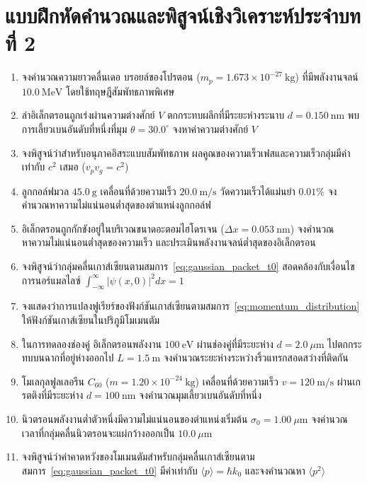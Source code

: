 \section{แบบฝึกหัดคำนวณและพิสูจน์เชิงวิเคราะห์ประจำบทที่ 2}

\begin{enumerate}
    \item จงคำนวณความยาวคลื่นเดอ บรอยล์ของโปรตอน ($m_p = 1.673 \times 10^{-27}~\text{kg}$) ที่มีพลังงานจลน์ $10.0~\text{MeV}$ โดยใช้ทฤษฎีสัมพัทธภาพพิเศษ
    \item ลำอิเล็กตรอนถูกเร่งผ่านความต่างศักย์ $V$ ตกกระทบผลึกที่มีระยะห่างระนาบ $d = 0.150~\text{nm}$ พบการเลี้ยวเบนอันดับที่หนึ่งที่มุม $\theta = 30.0^\circ$ จงหาค่าความต่างศักย์ $V$
    \item จงพิสูจน์ว่าสำหรับอนุภาคอิสระแบบสัมพัทธภาพ ผลคูณของความเร็วเฟสและความเร็วกลุ่มมีค่าเท่ากับ $c^2$ เสมอ ($v_p v_g = c^2$)
    \item ลูกกอล์ฟมวล $45.0~\text{g}$ เคลื่อนที่ด้วยความเร็ว $20.0~\text{m/s}$ วัดความเร็วได้แม่นยำ $0.01\%$ จงคำนวณหาความไม่แน่นอนต่ำสุดของตำแหน่งลูกกอล์ฟ
    \item อิเล็กตรอนถูกกักขังอยู่ในบริเวณขนาดอะตอมไฮโดรเจน ($\Delta x = 0.053~\text{nm}$) จงคำนวณหาความไม่แน่นอนต่ำสุดของความเร็ว และประเมินพลังงานจลน์ต่ำสุดของอิเล็กตรอน
    \item จงพิสูจน์ว่ากลุ่มคลื่นเกาส์เซียนตามสมการ~\eqref{eq:gaussian_packet_t0} สอดคล้องกับเงื่อนไขการนอร์แมลไลซ์ $\int_{-\infty}^\infty |\psi(x, 0)|^2 dx = 1$
    \item จงแสดงว่าการแปลงฟูเรียร์ของฟังก์ชันเกาส์เซียนตามสมการ~\eqref{eq:momentum_distribution} ให้ฟังก์ชันเกาส์เซียนในปริภูมิโมเมนตัม
    \item ในการทดลองช่องคู่ อิเล็กตรอนพลังงาน $100~\text{eV}$ ผ่านช่องคู่ที่มีระยะห่าง $d = 2.0~\mu\text{m}$ ไปตกกระทบบนฉากที่อยู่ห่างออกไป $L = 1.5~\text{m}$ จงคำนวณระยะห่างระหว่างริ้วแทรกสอดสว่างที่ติดกัน
    \item โมเลกุลฟูลเลอรีน $C_{60}$ ($m = 1.20 \times 10^{-24}~\text{kg}$) เคลื่อนที่ด้วยความเร็ว $v = 120~\text{m/s}$ ผ่านเกรตติงที่มีระยะห่าง $d = 100~\text{nm}$ จงคำนวณมุมเลี้ยวเบนอันดับที่หนึ่ง
    \item นิวตรอนพลังงานต่ำตัวหนึ่งมีความไม่แน่นอนของตำแหน่งเริ่มต้น $\sigma_0 = 1.00~\mu\text{m}$ จงคำนวณเวลาที่กลุ่มคลื่นนิวตรอนจะแผ่กว้างออกเป็น $10.0~\mu\text{m}$
    \item จงพิสูจน์ว่าค่าคาดหวังของโมเมนตัมสำหรับกลุ่มคลื่นเกาส์เซียนตามสมการ~\eqref{eq:gaussian_packet_t0} มีค่าเท่ากับ $\langle p \rangle = \hbar k_0$ และจงคำนวณหา $\langle p^2 \rangle$

\end{enumerate}

